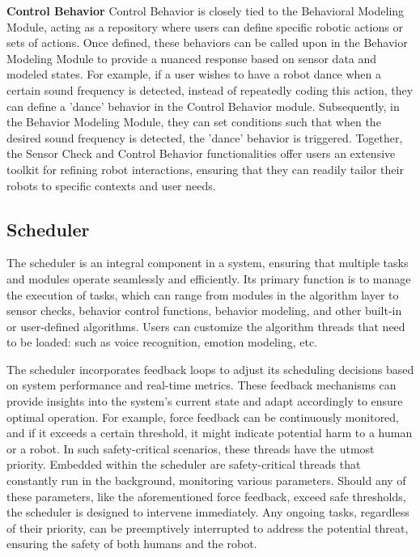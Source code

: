 \documentclass[runningheads]{llncs}
\begin{document}
\noindent\textbf{Control Behavior}
Control Behavior is closely tied to the Behavioral Modeling Module, acting as a repository where users can define specific robotic actions or sets of actions. Once defined, these behaviors can be called upon in the Behavior Modeling Module to provide a nuanced response based on sensor data and modeled states. 
For example, if a user wishes to have a robot dance when a certain sound frequency is detected, instead of repeatedly coding this action, they can define a 'dance' behavior in the Control Behavior module. Subsequently, in the Behavior Modeling Module, they can set conditions such that when the desired sound frequency is detected, the 'dance' behavior is triggered.
Together, the Sensor Check and Control Behavior functionalities offer users an extensive toolkit for refining robot interactions, ensuring that they can readily tailor their robots to specific contexts and user needs.

\subsection{Scheduler}
The scheduler is an integral component in a system, ensuring that multiple tasks and modules operate seamlessly and efficiently. Its primary function is to manage the execution of tasks, which can range from modules in the algorithm layer to sensor checks, behavior control functions, behavior modeling, and other built-in or user-defined algorithms. Users can customize the algorithm threads that need to be loaded: such as voice recognition, emotion modeling, etc.

The scheduler incorporates feedback loops to adjust its scheduling decisions based on system performance and real-time metrics. These feedback mechanisms can provide insights into the system's current state and adapt accordingly to ensure optimal operation. For example, force feedback can be continuously monitored, and if it exceeds a certain threshold, it might indicate potential harm to a human or a robot. In such safety-critical scenarios, these threads have the utmost priority. 
Embedded within the scheduler are safety-critical threads that constantly run in the background, monitoring various parameters. Should any of these parameters, like the aforementioned force feedback, exceed safe thresholds, the scheduler is designed to intervene immediately. Any ongoing tasks, regardless of their priority, can be preemptively interrupted to address the potential threat, ensuring the safety of both humans and the robot.
\end{document}
